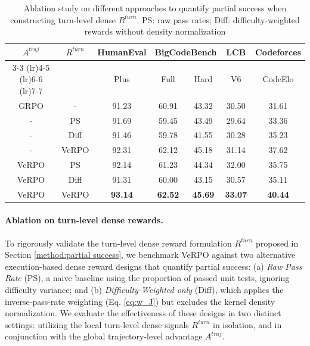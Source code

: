 \documentclass[11pt]{article}
\begin{document}
\begin{table}[t]
\centering
\fontsize{8.8pt}{9.79pt}\selectfont
\setlength{\tabcolsep}{1.15pt}
\begin{tabular}{ccccccc}
\toprule
\multirow{2}{*}{$A^{traj}$} & \multirow{2}{*}{$R^{turn}$} & HumanEval & \multicolumn{2}{c}{BigCodeBench} & LCB & Codeforces \\ \cmidrule(lr){3-3} \cmidrule(lr){4-5} \cmidrule(lr){6-6} \cmidrule(lr){7-7}
 &  & Plus & Full & Hard & V6 & CodeElo \\ \midrule
 GRPO & - & 91.23 & 60.91 & 43.32 & 30.50 & 31.61\\ \midrule
- & PS & 91.69 & 59.45 & 43.49 & 29.64 & 33.36 \\
- & Diff & 91.46 & 59.78 & 41.55 & 30.28 & 35.23 \\
- & VeRPO & 92.31 & 62.12 & 45.18 & 31.14 & 37.62 \\\midrule
VeRPO & PS & 92.14 & 61.23 & 44.34 & 32.00 & 35.75 \\
VeRPO & Diff & 91.31 & 60.00 & 43.15 & 30.57 & 35.11 \\ 
VeRPO & VeRPO & \textbf{93.14} & \textbf{62.52} & \textbf{45.69} & \textbf{33.07} & \textbf{40.44} \\ \bottomrule
\end{tabular}
\caption{Ablation study on different approaches to quantify partial success when constructing turn-level dense $R^{turn}$. PS: raw pass rates; Diff: difficulty-weighted rewards without density normalization}
\label{tab:ab2}
\end{table}

\paragraph{Ablation on turn-level dense rewards.} To rigorously validate the turn-level dense reward formulation $R^{turn}$ proposed in Section \ref{method:partial success}, we benchmark VeRPO against two alternative execution-based dense reward designs that quantify partial success: (a) \textit{Raw Pass Rate} (PS), a naive baseline using the proportion of passed unit tests, ignoring difficulty variance; and (b) \textit{Difficulty-Weighted only} (Diff), which applies the inverse-pass-rate weighting (Eq. \ref{eq:w_J}) but excludes the kernel density normalization. We evaluate the effectiveness of these designs in two distinct settings: utilizing the local turn-level dense signals $R^{turn}$ in isolation, and in conjunction with the global trajectory-level advantage $A^{traj}$.
\end{document}
